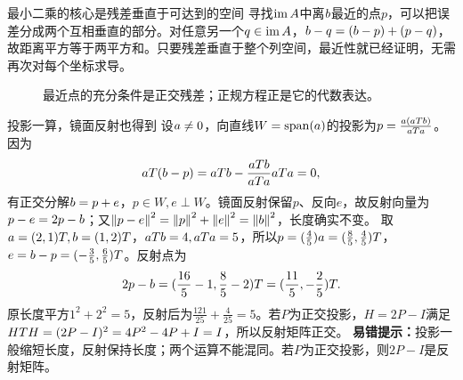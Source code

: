 \begin{insight}{最小二乘的核心是残差垂直于可达到的空间}
寻找$\operatorname{im} A$中离$b$最近的点$p$，可以把误差分成两个互相垂直的部分。对任意另一个$q\in\operatorname{im} A$，$b-q=(b-p)+(p-q)$，故距离平方等于两平方和。只要残差垂直于整个列空间，最近性就已经证明，无需再次对每个坐标求导。
\end{insight}
\begin{figure}[H]\centering
{}
\caption{最近点的充分条件是正交残差；正规方程正是它的代数表达。}\label{fig:projection-triangle}
\end{figure}
\begin{clevertrick}{投影一算，镜面反射也得到}
设$a\ne0$，向直线$W=\operatorname{span}(a)$的投影为$p=\frac{a(aTb)}{aTa}$。因为
\[aT(b-p)=aTb-\dfrac{aTb}{aTa}aTa=0,\]
有正交分解$b=p+e$，$p\in W,e\perp W$。镜面反射保留$p$、反向$e$，故反射向量为$p-e=2p-b$；又$\left\lVert p-e\right\rVert^2=\left\lVert p\right\rVert^2+\left\lVert e\right\rVert^2=\left\lVert b\right\rVert^2$，长度确实不变。
取$a=(2,1)T,b=(1,2)T$，$aTb=4,aTa=5$，所以$p=(\frac{4}{5})a=(\frac{8}{5},\frac{4}{5})T$，$e=b-p=(-\frac{3}{5},\frac{6}{5})T$。反射点为
\[2p-b=(\dfrac{16}{5}-1,\dfrac{8}{5}-2)T=(\dfrac{11}{5},-\dfrac{2}{5})T.\]
原长度平方$1^2+2^2=5$，反射后为$\frac{121}{25}+\frac{4}{25}=5$。若$P$为正交投影，$H=2P-I$满足$HT H=(2P-I)^2=4P^2-4P+I=I$，所以反射矩阵正交。
\textbf{易错提示：}投影一般缩短长度，反射保持长度；两个运算不能混同。若$P$为正交投影，则$2P-I$是反射矩阵。
\end{clevertrick}
